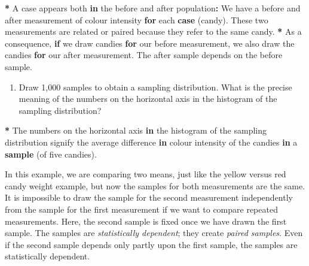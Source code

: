 \documentclass[a4paper]{book}
\newenvironment{Shaded}{\begin{snugshade}}{\end{snugshade}}
\newcommand{\KeywordTok}[1]{\textcolor[rgb]{0,0,0}{\textbf{#1}}}
\newcommand{\StringTok}[1]{\textcolor[rgb]{0.00,0.00,0.00}{#1}}
\newcommand{\ControlFlowTok}[1]{\textcolor[rgb]{0.00,0.00,0.00}{\textbf{#1}}}
\newcommand{\OperatorTok}[1]{\textcolor[rgb]{0.00,0.00,0.00}{\textbf{#1}}}
\newcommand{\NormalTok}[1]{#1}
\providecommand{\tightlist}{%
  \setlength{\itemsep}{0pt}\setlength{\parskip}{0pt}}
\theoremstyle{definition}
\theoremstyle{definition}
\theoremstyle{definition}
\theoremstyle{remark}
\begin{document}
\begin{Shaded}
\begin{Highlighting}[]
\OperatorTok{*}\StringTok{ }\NormalTok{A case appears both }\ControlFlowTok{in}\NormalTok{ the before and after population}\OperatorTok{:}\StringTok{ }\NormalTok{We have a before and}
\NormalTok{after measurement of colour intensity }\ControlFlowTok{for}\NormalTok{ each }\KeywordTok{case}\NormalTok{ (candy). These two}
\NormalTok{measurements are related or paired because they refer to the same candy.}
\OperatorTok{*}\StringTok{ }\NormalTok{As a consequence, }\ControlFlowTok{if}\NormalTok{ we draw candies }\ControlFlowTok{for}\NormalTok{ our before measurement, we also draw}
\NormalTok{the candies }\ControlFlowTok{for}\NormalTok{ our after measurement. The after sample depends on the before}
\NormalTok{sample.}
\end{Highlighting}
\end{Shaded}

\begin{enumerate}
\def\labelenumi{\arabic{enumi}.}
\setcounter{enumi}{2}
\tightlist
\item
  Draw 1,000 samples to obtain a sampling distribution. What is the
  precise meaning of the numbers on the horizontal axis in the histogram
  of the sampling distribution?
\end{enumerate}

\begin{Shaded}
\begin{Highlighting}[]
\OperatorTok{*}\StringTok{ }\NormalTok{The numbers on the horizontal axis }\ControlFlowTok{in}\NormalTok{ the histogram of the sampling}
\NormalTok{distribution signify the average difference }\ControlFlowTok{in}\NormalTok{ colour intensity of the candies}
\ControlFlowTok{in}\NormalTok{ a }\KeywordTok{sample}\NormalTok{ (of five candies).}
\end{Highlighting}
\end{Shaded}

In this example, we are comparing two means, just like the yellow versus
red candy weight example, but now the samples for both measurements are
the same. It is impossible to draw the sample for the second measurement
independently from the sample for the first measurement if we want to
compare repeated measurements. Here, the second sample is fixed once we
have drawn the first sample. The samples are \emph{statistically
dependent}; they create \emph{paired samples}. Even if the second sample
depends only partly upon the first sample, the samples are statistically
dependent.
\end{document}
